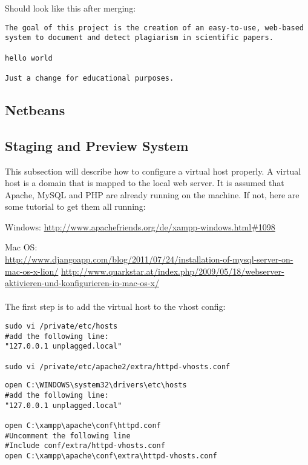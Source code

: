 Should look like this after merging:

\begin{lstlisting}[caption=Creating branches]
The goal of this project is the creation of an easy-to-use, web-based
system to document and detect plagiarism in scientific papers.

hello world

Just a change for educational purposes.
\end{lstlisting}

\subsection{Netbeans}

\subsection{Staging and Preview System}

This subsection will describe how to configure a virtual host properly. A virtual host is a domain that is mapped to the local web server. It is assumed that Apache, MySQL and PHP are already running on the machine. If not, here are some tutorial to get them all running:

Windows: \url{http://www.apachefriends.org/de/xampp-windows.html#1098}

Mac OS:\\
\url{http://www.djangoapp.com/blog/2011/07/24/installation-of-mysql-server-on-mac-os-x-lion/} \url{http://www.quarkstar.at/index.php/2009/05/18/webserver-aktivieren-und-konfigurieren-in-mac-os-x/}
\\\\The first step is to add the virtual host to the vhost config: 

\begin{lstlisting}[caption=Mac OS X: Creating virtual host]
sudo vi /private/etc/hosts
#add the following line:
"127.0.0.1 unplagged.local"

sudo vi /private/etc/apache2/extra/httpd-vhosts.conf
\end{lstlisting}

\begin{lstlisting}[caption=Windows: Creating a virtual host]
open C:\WINDOWS\system32\drivers\etc\hosts
#add the following line:
"127.0.0.1 unplagged.local"

open C:\xampp\apache\conf\httpd.conf
#Uncomment the following line
#Include conf/extra/httpd-vhosts.conf
open C:\xampp\apache\conf\extra\httpd-vhosts.conf
\end{lstlisting}

